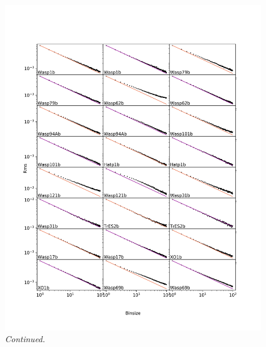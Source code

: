 \begin{subappendices}
  \addtocounter{figure}{-1}
  \begin{figure}
      \label{P1:fig:rmsvsbin1}
    \includegraphics[width=\textwidth]{rmsVsbinsize1.pdf}
    \caption{\textit{Continued.}}
  \end{figure}


\end{subappendices}
